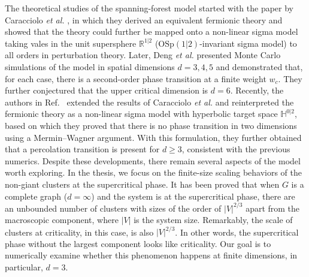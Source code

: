 The theoretical studies of the spanning-forest model started with the paper by Caracciolo \textit{et al.} \cite{Caracciolo2004}, in which they derived
an equivalent fermionic theory and showed that the theory could further be mapped onto a non-linear sigma model taking vales in the unit supersphere
$\mathbb{R}^{1|2}$ ($\text{OSp}(1|2)$-invariant sigma model) to all orders in perturbation theory. 
Later, Deng \textit{et al.}\cite{Deng2007} presented Monte Carlo simulations of the model in spatial dimensions $d = 3, 4, 5$ and demonstrated that, for each case, there is a second-order phase transition at a finite weight
$w_c$. They further conjectured that the upper critical dimension is $d=6$. Recently, the authors in Ref.~ extended the results
of Caracciolo \textit{et al.} and reinterpreted the fermionic theory as a non-linear sigma model with hyperbolic target space $\mathbb{H}^{0|2}$, based on which
they proved that there is no phase transition in two dimensions using a Mermin–Wagner argument. With this formulation, they further
obtained \cite{Roland2021Percolation} that a percolation transition is present for $d \geq 3$, consistent with the previous numerics. Despite these developments, there remain several aspects of
the model worth exploring. In the thesis, we focus on the finite-size scaling behaviors of the non-giant clusters at the supercritical phase.
It has been proved that \cite{Luczak1992,Martin2018} when $G$ is a complete graph ($d=\infty$) and the system is at the supercritical phase, there are an unbounded number of clusters with sizes of the order of $|V|^{2/3}$ apart from the macroscopic component,
where $|V|$ is the system size. Remarkably, the scale of clusters at criticality, in this case, is also $|V|^{2/3}$. In other words, the supercritical
phase without the largest component looks like criticality. Our goal is to numerically examine whether this phenomenon happens at finite dimensions, in particular, $d=3$.

